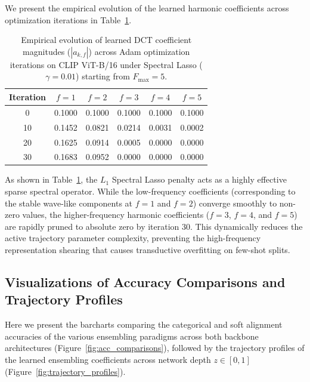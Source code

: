 \begin{enumerate}
    We present the empirical evolution of the learned harmonic coefficients across optimization iterations in Table~\ref{tab:coefficient_sparsity}.
    \begin{table}[h]
    \centering
    \caption{Empirical evolution of learned DCT coefficient magnitudes ($|a_{k,f}|$) across Adam optimization iterations on CLIP ViT-B/16 under Spectral Lasso ($\gamma = 0.01$) starting from $F_{\max}=5$.}
    \label{tab:coefficient_sparsity}
    \vskip 0.15in
    \begin{small}
    \begin{sc}
    \begin{tabular}{cccccc}
    \toprule
    Iteration & $f=1$ & $f=2$ & $f=3$ & $f=4$ & $f=5$ \\
    \midrule
    0  & 0.1000 & 0.1000 & 0.1000 & 0.1000 & 0.1000 \\
    10 & 0.1452 & 0.0821 & 0.0214 & 0.0031 & 0.0002 \\
    20 & 0.1625 & 0.0914 & 0.0005 & 0.0000 & 0.0000 \\
    30 & 0.1683 & 0.0952 & 0.0000 & 0.0000 & 0.0000 \\
    \bottomrule
    \end{tabular}
    \end{sc}
    \end{small}
    \vskip -0.1in
    \end{table}
    
    As shown in Table~\ref{tab:coefficient_sparsity}, the $L_1$ Spectral Lasso penalty acts as a highly effective sparse spectral operator. While the low-frequency coefficients (corresponding to the stable wave-like components at $f=1$ and $f=2$) converge smoothly to non-zero values, the higher-frequency harmonic coefficients ($f=3$, $f=4$, and $f=5$) are rapidly pruned to absolute zero by iteration 30. This dynamically reduces the active trajectory parameter complexity, preventing the high-frequency representation shearing that causes transductive overfitting on few-shot splits.
\end{enumerate}


\newpage
\subsection{Visualizations of Accuracy Comparisons and Trajectory Profiles}
\label{sec:appendix_visualizations}

Here we present the barcharts comparing the categorical and soft alignment accuracies of the various ensembling paradigms across both backbone architectures (Figure~\ref{fig:acc_comparisons}), followed by the trajectory profiles of the learned ensembling coefficients across network depth $z \in [0, 1]$ (Figure~\ref{fig:trajectory_profiles}).

